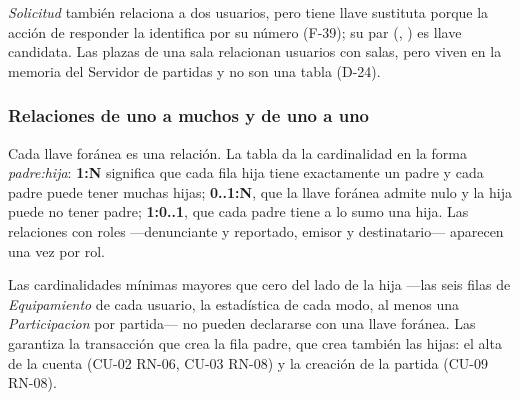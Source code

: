 \textit{Solicitud} también relaciona a dos usuarios, pero tiene llave sustituta porque la acción de responder la identifica por su número (\mbox{F-39}); su par (, ) es llave candidata. Las plazas de una sala relacionan usuarios con salas, pero viven en la memoria del Servidor de partidas y no son una tabla (\mbox{D-24}).

\subsubsection*{Relaciones de uno a muchos y de uno a uno}

Cada llave foránea es una relación. La tabla da la cardinalidad en la forma \emph{padre:hija}: \textbf{1:N} significa que cada fila hija tiene exactamente un padre y cada padre puede tener muchas hijas; \textbf{0..1:N}, que la llave foránea admite nulo y la hija puede no tener padre; \textbf{1:0..1}, que cada padre tiene a lo sumo una hija. Las relaciones con roles —denunciante y reportado, emisor y destinatario— aparecen una vez por rol.

Las cardinalidades mínimas mayores que cero del lado de la hija —las seis filas de \textit{Equipamiento} de cada usuario, la estadística de cada modo, al menos una \textit{Participacion} por partida— no pueden declararse con una llave foránea. Las garantiza la transacción que crea la fila padre, que crea también las hijas: el alta de la cuenta (\mbox{CU-02} \mbox{RN-06}, \mbox{CU-03} \mbox{RN-08}) y la creación de la partida (\mbox{CU-09} \mbox{RN-08}).


